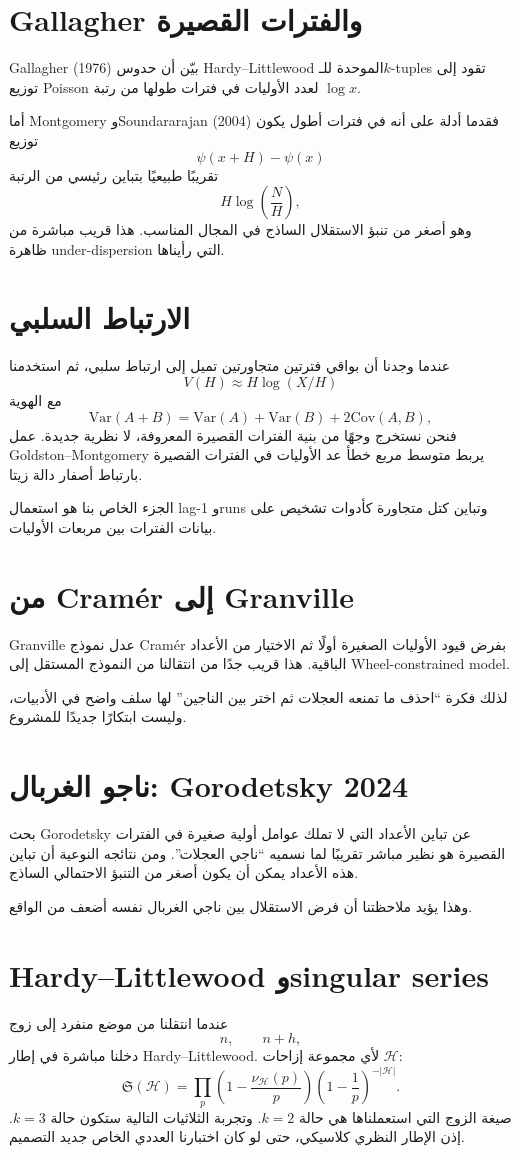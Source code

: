 \documentclass[12pt]{article}
\begin{document}
\section{Gallagher والفترات القصيرة}
Gallagher (1976) بيّن أن حدوس Hardy--Littlewood الموحدة للـ$k$-tuples تقود إلى توزيع Poisson لعدد الأوليات في فترات طولها من رتبة $\log x$.

أما Montgomery وSoundararajan (2004) فقدما أدلة على أنه في فترات أطول يكون توزيع
\[
\psi(x+H)-\psi(x)
\]
تقريبًا طبيعيًا بتباين رئيسي من الرتبة
\[
H\log\left(\frac{N}{H}\right),
\]
وهو أصغر من تنبؤ الاستقلال الساذج في المجال المناسب. هذا قريب مباشرة من ظاهرة under-dispersion التي رأيناها.

\section{الارتباط السلبي}
عندما وجدنا أن بواقي فترتين متجاورتين تميل إلى ارتباط سلبي، ثم استخدمنا
\[
V(H)\approx H\log(X/H)
\]
مع الهوية
\[
\mathrm{Var}(A+B)=\mathrm{Var}(A)+\mathrm{Var}(B)+2\mathrm{Cov}(A,B),
\]
فنحن نستخرج وجهًا من بنية الفترات القصيرة المعروفة، لا نظرية جديدة. عمل Goldston--Montgomery يربط متوسط مربع خطأ عد الأوليات في الفترات القصيرة بارتباط أصفار دالة زيتا.

الجزء الخاص بنا هو استعمال lag-1 وruns وتباين كتل متجاورة كأدوات تشخيص على بيانات الفترات بين مربعات الأوليات.

\section{من Cram\'er إلى Granville}
Granville عدل نموذج Cram\'er بفرض قيود الأوليات الصغيرة أولًا ثم الاختيار من الأعداد الباقية. هذا قريب جدًا من انتقالنا من النموذج المستقل إلى Wheel-constrained model.

لذلك فكرة ``احذف ما تمنعه العجلات ثم اختر بين الناجين'' لها سلف واضح في الأدبيات، وليست ابتكارًا جديدًا للمشروع.

\section{ناجو الغربال: Gorodetsky 2024}
بحث Gorodetsky عن تباين الأعداد التي لا تملك عوامل أولية صغيرة في الفترات القصيرة هو نظير مباشر تقريبًا لما نسميه ``ناجي العجلات''. ومن نتائجه النوعية أن تباين هذه الأعداد يمكن أن يكون أصغر من التنبؤ الاحتمالي الساذج.

وهذا يؤيد ملاحظتنا أن فرض الاستقلال بين ناجي الغربال نفسه أضعف من الواقع.

\section{Hardy--Littlewood وsingular series}
عندما انتقلنا من موضع منفرد إلى زوج
\[
n,\qquad n+h,
\]
دخلنا مباشرة في إطار Hardy--Littlewood. لأي مجموعة إزاحات $\mathcal H$:
\[
\mathfrak S(\mathcal H)
=
\prod_p
\left(1-\frac{\nu_{\mathcal H}(p)}p\right)
\left(1-\frac1p\right)^{-|\mathcal H|}.
\]
صيغة الزوج التي استعملناها هي حالة $k=2$. وتجربة الثلاثيات التالية ستكون حالة $k=3$. إذن الإطار النظري كلاسيكي، حتى لو كان اختبارنا العددي الخاص جديد التصميم.
\end{document}
